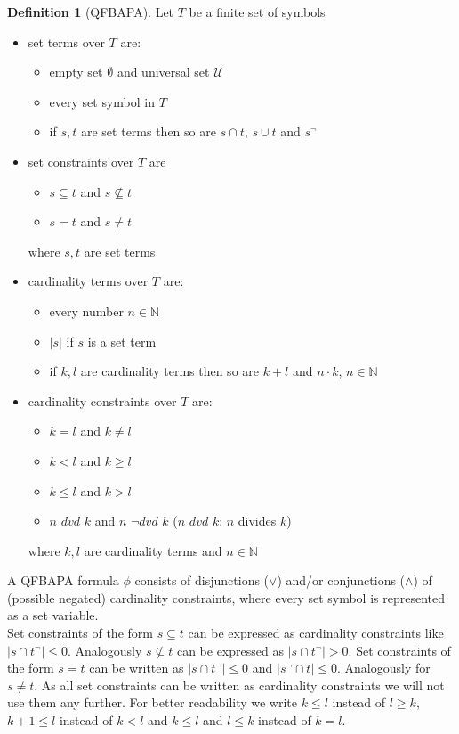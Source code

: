 \documentclass{book}
\theoremstyle{break}
\theoremstyle{definition}
\newtheorem{mydef}{Definition}
\begin{document}
\begin{mydef}[QFBAPA]
Let $T$ be a finite set of symbols
\begin{itemize}
\item set terms over $T$ are:
\begin{itemize}
\item empty set $\emptyset$ and universal set $
\mathcal{U}$
\item every set symbol in $T$
\item if $s,t$ are set terms then so are $s\cap t$, $s\cup t$ and $s^{\neg}$
\end{itemize}
\item set constraints over $T$ are
\begin{itemize}
\item $s\subseteq t$ and $s\not\subseteq t$
\item $s=t$ and $s\neq t$
\end{itemize}
where $s,t$ are set terms
\item cardinality terms over $T$ are:
\begin{itemize}
\item every number $n\in \mathbb{N}$
\item $|s|$ if $s$ is a set term
\item if $k,l$ are cardinality terms then so are $k+l$ and $n\cdot k$, $n\in \mathbb{N}$
\end{itemize}
\item cardinality constraints over $T$ are:
\begin{itemize}
\item $k=l$ and $k\neq l$
\item $k<l$ and $k\geq l$
\item $k\leq l$ and $k>l$
\item $n$ $dvd$ $k$ and $n$ $\neg dvd$ $k$ ($n$ $dvd$ $k$: $n$ divides $k$)
\end{itemize}
where $k,l$ are cardinality terms and $n\in\mathbb{N}$
\end{itemize}
\end{mydef}
A QFBAPA formula $\phi$ consists of disjunctions ($\vee$) and/or conjunctions ($\wedge$) of (possible negated) cardinality constraints, where every set symbol is represented as a set variable.\\
Set constraints of the form $s\subseteq t$ can be expressed as cardinality constraints like $|s\cap t^\neg|\leq 0$. Analogously $s\not\subseteq t$ can be expressed as $|s\cap t^\neg|> 0$. Set constraints of the form $s=t$ can be written as $|s\cap t^\neg|\leq 0$ and $|s^\neg\cap t|\leq 0$. Analogously for $s\neq t$. As all set constraints can be written as cardinality constraints we will not use them any further. For better readability we write $k\leq l$ instead of $l\geq k$, $k+1\leq l$  instead of $k<l$ and $k\leq l$ and $l\leq k$ instead of $k=l$.\\
\end{document}
